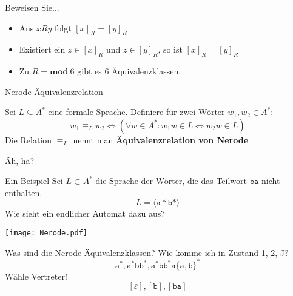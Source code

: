 \begin{frame}{Beweisen Sie...}
	\begin{itemize}
		\item Aus $xRy$ folgt $[x]_R = [y]_R$
		\item Existiert ein $z \in [x]_R$ und $z \in [y]_R$, so ist $[x]_R = [y]_R$
		\item Zu $R = \textbf{mod} \ 6$ gibt es 6 Äquivalenzklassen.
	\end{itemize}
\end{frame}

\begin{frame}{Nerode-Äquivalenzrelation}
	\begin{Definition}
		Sei $L \subseteq A^\ast$ eine formale Sprache. Definiere für zwei Wörter $w_1, w_2 \in A^\ast$: $$w_1 \equiv_L w_2 \iff (\forall w \in A^\ast: w_1 w \in L \iff w_2 w \in L)$$
		Die Relation $\equiv_L$ nennt man \textbf{Äquivalenzrelation von Nerode}
	\end{Definition} \pause
	Äh, hä?
\end{frame}

\begin{frame}{Ein Beispiel}
	Sei $L \subset A^\ast$ die Sprache der Wörter, die das Teilwort $\mathtt{ba}$ nicht enthalten. \pause
	$$L = \langle \mathtt a\ast \mathtt b\ast \rangle$$ Wie sieht ein endlicher Automat dazu aus? \pause 
	\begin{minipage}{0.49\linewidth}\vspace*{1em}
		\centering
		\texttt{[image: Nerode.pdf]}
	\end{minipage}
	\begin{minipage}{0.49\linewidth}
		Was sind die Nerode Äquivalenz\-klassen? \pause
		Wie komme ich in Zustand 1, 2, J? \pause
		$$\mathtt a^\ast, \mathtt a^\ast \mathtt b \mathtt b^\ast, \mathtt a^\ast \mathtt b \mathtt b^\ast \mathtt a \{\mathtt a, \mathtt b\}^\ast $$ \pause
		Wähle Vertreter! $$[\varepsilon], [\mathtt b], [\mathtt{ba}]$$
	\end{minipage}
\end{frame}

